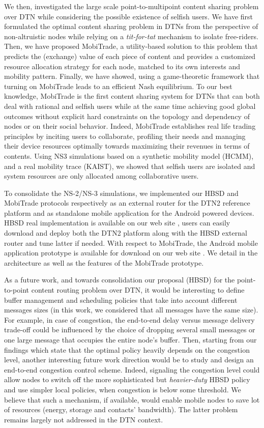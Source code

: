 We then, investigated the large scale point-to-multipoint content sharing problem over DTN while considering the possible existence of selfish users. We have first formulated the optimal content sharing problem in DTNs from the perspective of non-altruistic nodes while relying on a \emph{tit-for-tat} mechanism to isolate free-riders. Then, we have proposed MobiTrade, a utility-based solution to this problem that predicts the (exchange) value of each piece of content and provides a customized resource allocation strategy for each node, matched to its own interests and mobility pattern. Finally, we have showed, using a game-theoretic framework that turning on MobiTrade leads to an efficient Nash equilibrium. To our best knowledge, MobiTrade is the first content sharing
system for DTNs that can both deal with rational and selfish users while at the same time achieving good global outcomes
without explicit hard constraints on the topology and dependency of nodes or on their social behavior. Indeed, MobiTrade establishes real life trading principles by inciting users to collaborate, profiling their needs and managing their device resources optimally towards maximizing their revenues in terms of contents. Using NS3 simulations based on a synthetic mobility model (HCMM), and a real mobility trace (KAIST), we showed that selfish users are isolated and system resources are only allocated among collaborative users. 

To consolidate the NS-2/NS-3 simulations, we implemented our HBSD and MobiTrade protocols respectively as an external router for the DTN2 reference platform and as standalone mobile application for the Android powered devices. HBSD real implementation is available on our web site \cite{HBSDDTN2}, users can easily download and deploy both the DTN2 platform along with the HBSD external router and tune latter if needed. With respect to MobiTrade, the Android mobile application prototype is available for download on our web site \cite{MobiTradeAndroid}. We detail in \cite{MobiTradeAndroid} the architecture as well as the features of the MobiTrade prototype. 

As a future work, and towards consolidation our proposal (HBSD) for the point-to-point content routing problem over DTN, it would be interesting to define buffer management and scheduling policies that take into account different messages sizes (in this work, we considered that all messages have the same size). For example, in case of congestion, the end-to-end delay versus message delivery trade-off could be influenced by the choice of dropping several small messages or one large message that occupies the entire node's buffer. Then, starting from our findings which state that 
the optimal policy heavily depends on the congestion level, another interesting future work direction would be to study and design an end-to-end congestion control scheme. Indeed, signaling the congestion level could allow nodes to switch off the more sophisticated but \emph{heavier-duty} HBSD policy and use simpler local policies, when congestion is below
some threshold. We believe that such a mechanism, if available, would enable mobile nodes to save lot of resources (energy, storage and contacts' bandwidth). The latter problem remains largely not addressed in the DTN context.

